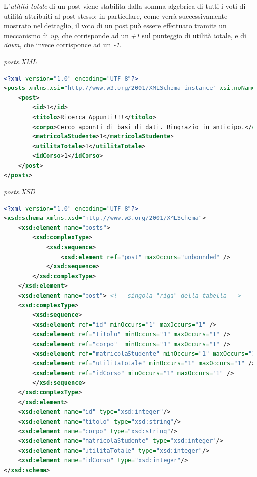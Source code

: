 \documentclass [a4paper,11pt]{book}
\begin{document}
L'\emph{utilità totale} di un post viene stabilita dalla somma algebrica di tutti i voti di utilità attribuiti al post stesso; in particolare, come verrà successivamente mostrato nel dettaglio, il voto di un post può essere effettuato tramite un meccanismo di \emph{up}, che corrisponde ad un \emph{+1} sul punteggio di utilità totale, e di \emph{down}, che invece corrisponde ad un \emph{-1}.

\medskip

\emph{posts.XML}

\label{sec:posts}

\begin{lstlisting}[language=XML]
<?xml version="1.0" encoding="UTF-8"?>
<posts xmlns:xsi="http://www.w3.org/2001/XMLSchema-instance" xsi:noNamespaceSchemaLocation="posts.xsd">
    <post>
        <id>1</id>
        <titolo>Ricerca Appunti!!!</titolo>
        <corpo>Cerco appunti di basi di dati. Ringrazio in anticipo.</corpo>
        <matricolaStudente>1</matricolaStudente>
        <utilitaTotale>1</utilitaTotale>
        <idCorso>1</idCorso>
    </post>
</posts>
\end{lstlisting}

\emph{posts.XSD}

\begin{lstlisting}[language=XML]
<?xml version="1.0" encoding="UTF-8"?>
<xsd:schema xmlns:xsd="http://www.w3.org/2001/XMLSchema">
    <xsd:element name="posts">
        <xsd:complexType>
            <xsd:sequence>
                <xsd:element ref="post" maxOccurs="unbounded" />
            </xsd:sequence>
        </xsd:complexType>
    </xsd:element>
    <xsd:element name="post"> <!-- singola "riga" della tabella -->
    <xsd:complexType>
        <xsd:sequence>
        <xsd:element ref="id" minOccurs="1" maxOccurs="1" />
        <xsd:element ref="titolo" minOccurs="1" maxOccurs="1" />
        <xsd:element ref="corpo"  minOccurs="1" maxOccurs="1" />
        <xsd:element ref="matricolaStudente" minOccurs="1" maxOccurs="1" />
        <xsd:element ref="utilitaTotale" minOccurs="1" maxOccurs="1" />
        <xsd:element ref="idCorso" minOccurs="1" maxOccurs="1" />
        </xsd:sequence>   
    </xsd:complexType>
    </xsd:element>
    <xsd:element name="id" type="xsd:integer"/>
    <xsd:element name="titolo" type="xsd:string"/>
    <xsd:element name="corpo" type="xsd:string"/>
    <xsd:element name="matricolaStudente" type="xsd:integer"/>
    <xsd:element name="utilitaTotale" type="xsd:integer"/>
    <xsd:element name="idCorso" type="xsd:integer"/>
</xsd:schema>
\end{lstlisting}
\end{document}
